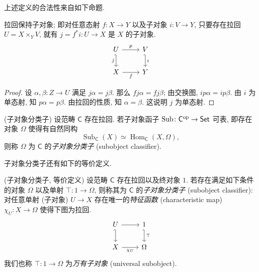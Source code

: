 上述定义的合法性来自如下命题.

\begin{prop}{}
    拉回保持子对象; 即对任意态射 $f \colon X \to Y$ 以及子对象 $i \colon V \to Y$, 只要存在拉回 $U = X\times_{Y} V$, 就有 $j=f^* i\colon U\to X$ 是 $X$ 的子对象.
\[\begin{tikzcd}[ampersand replacement=\&]
	U \& V \\
	X \& Y
	\arrow["f"', from=2-1, to=2-2]
	\arrow["j"', hook', from=1-1, to=2-1]
	\arrow["p", from=1-1, to=1-2]
	\arrow["i", hook', from=1-2, to=2-2]
\end{tikzcd}\]
\end{prop}
\begin{proof}
    设 $\alpha,\beta \colon Z \to U$ 满足 $j \alpha = j \beta$.
    那么 $fj\alpha = fj\beta$; 由交换图, $ip\alpha=ip\beta$.
    由 $i$ 为单态射, 知 $p\alpha=p\beta$.
    由拉回的性质, 知 $\alpha = \beta$.
    这说明 $j$ 为单态射.
\end{proof}


\begin{definition}[label={Subobject-classifier-definition}]{(子对象分类子)}
    设范畴 $\mathsf C$ 存在拉回. 若子对象函子 $\operatorname{Sub} \colon \mathsf C^{\text{op}} \to \mathsf {Set}$ 可表, 即存在对象 $\Omega$ 使得有自然同构
    $$
    \operatorname{Sub}_{\mathsf C}(X) \simeq \operatorname{Hom}_{\mathsf C}(X,\Omega),
    $$
    则称 $\Omega$ 为 $\mathsf C$ 的\emph{子对象分类子} (subobject classifier).
\end{definition}

子对象分类子还有如下的等价定义.

\begin{definition}[label={Subobject-classifier-definition-alternative}]{(子对象分类子, 等价定义)}
    设范畴 $\mathsf C$ 存在拉回以及终对象 $1$. 若存在满足如下条件的对象 $\Omega$ 以及单射 $\top \colon 1 \to \Omega$, 则称其为 $\mathsf C$ 的\emph{子对象分类子} (subobject classifier): 对任意单射 (子对象) $U \to X$ 存在唯一的\emph{特征函数} (characteristic map) $\chi_U \colon X \to \Omega$ 使得下图为拉回.
    \[\begin{tikzcd}[ampersand replacement=\&]
    	U \& 1 \\
    	X \& \Omega
    	\arrow["{\chi_U}"', from=2-1, to=2-2]
    	\arrow[hook', from=1-1, to=2-1]
    	\arrow["\top", hook', from=1-2, to=2-2]
    	\arrow[from=1-1, to=1-2]
    \end{tikzcd}\]
    我们也称 $\top \colon 1 \to \Omega$ 为\emph{万有子对象} (universal subobject).
\end{definition}

